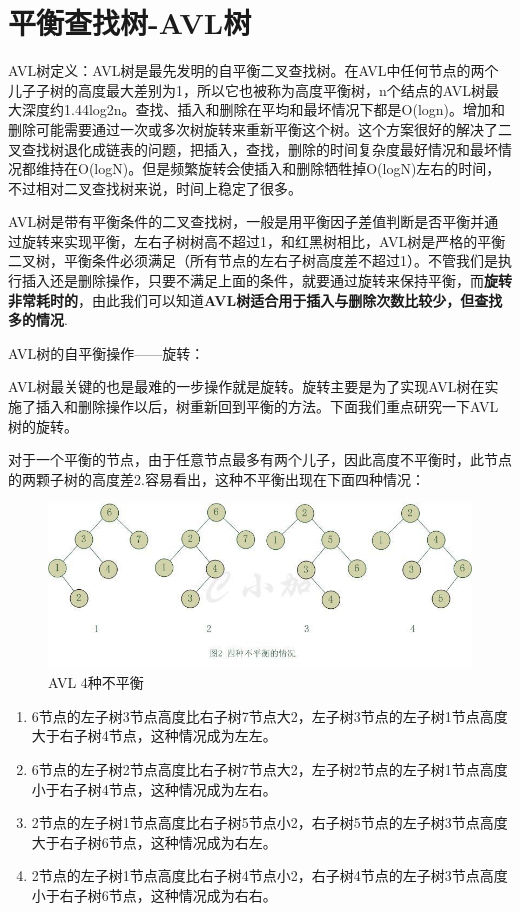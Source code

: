 \documentclass[UTF8,a4paper,12pt]{ctexbook}
\begin{document}
	\section{平衡查找树-AVL树}
			AVL树定义：AVL树是最先发明的自平衡二叉查找树。在AVL中任何节点的两个儿子子树的高度最大差别为1，所以它也被称为高度平衡树，n个结点的AVL树最大深度约1.44log2n。查找、插入和删除在平均和最坏情况下都是O(logn)。增加和删除可能需要通过一次或多次树旋转来重新平衡这个树。这个方案很好的解决了二叉查找树退化成链表的问题，把插入，查找，删除的时间复杂度最好情况和最坏情况都维持在O(logN)。但是频繁旋转会使插入和删除牺牲掉O(logN)左右的时间，不过相对二叉查找树来说，时间上稳定了很多。
			
			AVL树是带有平衡条件的二叉查找树，一般是用平衡因子差值判断是否平衡并通过旋转来实现平衡，左右子树树高不超过1，和红黑树相比，AVL树是严格的平衡二叉树，平衡条件必须满足（所有节点的左右子树高度差不超过1）。不管我们是执行插入还是删除操作，只要不满足上面的条件，就要通过旋转来保持平衡，而\textbf{旋转非常耗时的}，由此我们可以知道\textbf{AVL树适合用于插入与删除次数比较少，但查找多的情况}.
			
			AVL树的自平衡操作——旋转：
			
			AVL树最关键的也是最难的一步操作就是旋转。旋转主要是为了实现AVL树在实施了插入和删除操作以后，树重新回到平衡的方法。下面我们重点研究一下AVL树的旋转。
			
			对于一个平衡的节点，由于任意节点最多有两个儿子，因此高度不平衡时，此节点的两颗子树的高度差2.容易看出，这种不平衡出现在下面四种情况：
			\begin{figure}[H]
				\centering
				\includegraphics[scale = 0.8]{AVL.jpg}
				\caption{AVL 4种不平衡}
				\label{AVL}
			\end{figure}
				
			\begin{enumerate}[itemindent = 1em,label = (\arabic{enumi})]
				\item  6节点的左子树3节点高度比右子树7节点大2，左子树3节点的左子树1节点高度大于右子树4节点，这种情况成为左左。
				\item  6节点的左子树2节点高度比右子树7节点大2，左子树2节点的左子树1节点高度小于右子树4节点，这种情况成为左右。
				\item  2节点的左子树1节点高度比右子树5节点小2，右子树5节点的左子树3节点高度大于右子树6节点，这种情况成为右左。
				\item  2节点的左子树1节点高度比右子树4节点小2，右子树4节点的左子树3节点高度小于右子树6节点，这种情况成为右右。
			\end{enumerate}
			
\end{document}
